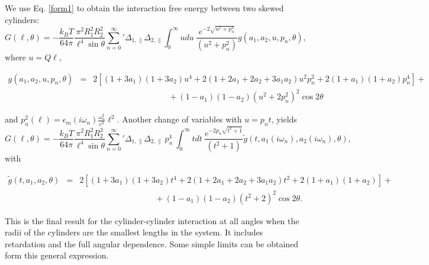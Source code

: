 \documentclass[onecolumn,letterpaper,amsmath,amssymb,floatfix,aps,superscriptaddress]{revtex4}
\begin{document}
We use  Eq. \ref{form1} to obtain the interaction free energy between two skewed cylinders:
\begin{equation}
G(\ell,\theta) = - \frac{k_BT}{64 \pi} \frac{ \pi^2 R_1^{2} R_2^{2} }{\ell^{4} \sin{\theta}} {\sum_{n=0}^{\infty}}' \Delta_{1,\parallel} \Delta_{2,\parallel} \int_0^{\infty}  u du ~\frac{e^{- 2 \sqrt{u^{2} + p_n^{2}}}}{(u^{2} + p_n^{2})}  g(a_1, a_2, u, p_n, \theta),
\label{pars-3}
\end{equation}
where $u = Q \ell$,  
\begin{widetext}
\begin{eqnarray}
g(a_1, a_2, u, p_n, \theta) &=&  2 \left[ (1+3a_1)(1+3a_2) u^{4} + 2(1+2a_1+2a_2+3a_1a_2) u^{2}p_n^{2}  + 2(1+a_1)(1+a_2) p_n^{4}\right] + \nonumber \\ 
& & ~~~~~~~~~~~~~~~~~~~~~~~~~~~~~~~~~~~~~~~~~ + (1-a_1)(1-a_2)(u^{2} + 2 p_n^{2})^2 \cos 2\theta
\end{eqnarray}
\end{widetext}
and $p_n^{2}(\ell) =  \epsilon_m(i \omega_n) \frac{\omega_n^{2}}{c^{2}} \ell^{2}$. Another change of variables with $u = p_n t$, yields 
\begin{equation}
G(\ell,\theta) = - \frac{k_BT}{64 \pi} \frac{ \pi^2 R_1^{2} R_2^{2} }{\ell^{4} \sin{\theta}} {\sum_{n=0}^{\infty}}' \Delta_{1,\parallel} \Delta_{2,\parallel} ~p_n^{4} ~\int_0^{\infty} t dt ~\frac{e^{- 2 p_n \sqrt{t^{2} + 1}}}{(t^{2} + 1)} \tilde g(t, a_1(i \omega_n), a_2(i \omega_n), \theta),
\label{pars-31}
\end{equation}
with
\begin{widetext}
\begin{eqnarray}
\tilde g(t, a_1, a_2, \theta) &=& 2 \left[ (1+3a_1)(1+3a_2) t^{4} + 2 (1+2a_1+2a_2+3a_1a_2) t^{2}  + 2(1+a_1)(1+a_2)\right] + \nonumber \\
& & ~~~~~~~~~~~~~~~~~~~~~~~~~~~~~~~~~~~~~~~~~ + (1-a_1)(1-a_2)(t^{2} + 2)^2 \cos 2\theta.
\label{pars-31-g}
\end{eqnarray}
\end{widetext}
This is the final result for the cylinder-cylinder interaction at all angles when the radii of the cylinders are the smallest lengths in the system. It includes retardation and the full angular dependence. Some simple limits can be obtained form this general expression.
\end{document}
